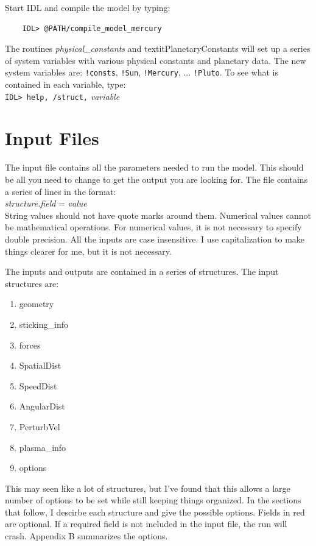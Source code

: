 \documentclass[11pt]{article}
\begin{document}
Start IDL and compile the model by typing: 
\begin{verbatim}
    IDL> @PATH/compile_model_mercury
\end{verbatim}

The routines \textit{physical\_constants} and textit{PlanetaryConstants} will 
set up a series of system variables with various physical constants and 
planetary data. The new
system variables are: \texttt{!consts}, \texttt{!Sun}, \texttt{!Mercury}, ...
\texttt{!Pluto}. To see what is contained in each variable, type: \\
\hspace*{1cm}\texttt{IDL> help, /struct,} \textit{variable}

\section{Input Files}

The input file contains all the parameters needed to run the model. This should 
be all you need to change to get the output you are looking for. The file 
contains a series of lines in the format: \\
\hspace*{1cm} \textit{structure.field} = \textit{value}  \\
String values should not have quote marks around them. Numerical values cannot 
be mathematical operations. For numerical values, it is not necessary to 
specify double precision. All the inputs are case insensitive. I use 
capitalization to make things clearer for me, but it is not necessary.

The inputs and outputs are contained in a series of structures. The input 
structures are:
\begin{enumerate}
\item geometry
\item sticking\_info
\item forces
\item SpatialDist
\item SpeedDist
\item AngularDist
\item PerturbVel
\item plasma\_info
\item options
\end{enumerate}
This may seen like a lot of structures, but I've found that this allows a large 
number of options to be set while still keeping things organized. In the 
sections that follow, I descirbe each structure and give the possible options. 
Fields in red are optional. If a required field is not included in the input 
file, the run will crash. Appendix B summarizes the options.
\end{document}
